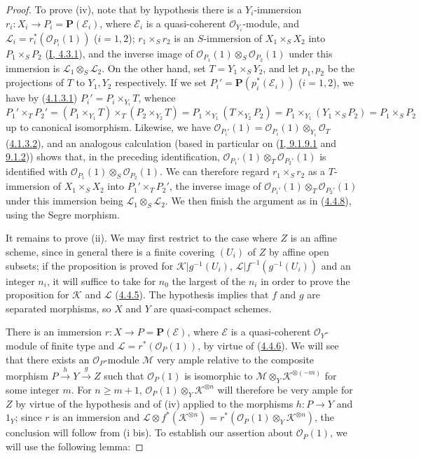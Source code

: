 \begin{proof}
To prove (iv), note that by hypothesis there is a $Y_i$-immersion
$r_i:X_i\to P_i=\mathbf{P}(\mathcal{E}_i)$, where $\mathcal{E}_i$ is a
quasi-coherent $\mathcal{O}_{Y_i}$-module, and
$\mathcal{L}_i=r_i^*(\mathcal{O}_{P_i}(1))$ ($i=1,2$);
$r_1\times_Sr_2$ is an $S$-immersion of $X_1\times_SX_2$ into
$P_1\times_SP_2$ (\hyperref[I.4.3.1]{I, 4.3.1}), and the inverse image of
$\mathcal{O}_{P_1}(1)\otimes_S\mathcal{O}_{P_2}(1)$ under this immersion is
$\mathcal{L}_1\otimes_S\mathcal{L}_2$. On the other hand, set
$T=Y_1\times_SY_2$, and let $p_1,p_2$ be the projections of $T$ to $Y_1,Y_2$
respectively. If we set
$P_i'=\mathbf{P}(p_i^*(\mathcal{E}_i))$ ($i=1,2$), we have by
(\hyperref[II.4.1.3.1]{4.1.3.1}) $P_i'=P_i\times_{Y_i}T$, whence
\[
  P_1'\times_TP_2'
  =(P_1\times_{Y_1}T)\times_T(P_2\times_{Y_2}T)
  =P_1\times_{Y_1}(T\times_{Y_2}P_2)
  =P_1\times_{Y_1}(Y_1\times_SP_2)
  =P_1\times_SP_2
\]
up to canonical isomorphism. Likewise, we have
$\mathcal{O}_{P_i'}(1)=\mathcal{O}_{P_i}(1)\otimes_{Y_i}\mathcal{O}_T$
(\hyperref[II.4.1.3.2]{4.1.3.2}), and an analogous calculation (based in
particular on (\hyperref[I.9.1.9.1]{I, 9.1.9.1} and
\hyperref[I.9.1.2]{9.1.2})) shows that, in the preceding identification,
$\mathcal{O}_{P_1'}(1)\otimes_T\mathcal{O}_{P_2'}(1)$ is identified with
$\mathcal{O}_{P_1}(1)\otimes_S\mathcal{O}_{P_2}(1)$. We can therefore regard
$r_1\times_Sr_2$ as a $T$-immersion of $X_1\times_SX_2$ into
$P_1'\times_TP_2'$, the inverse image of
$\mathcal{O}_{P_1'}(1)\otimes_T\mathcal{O}_{P_2'}(1)$ under this immersion
being $\mathcal{L}_1\otimes_S\mathcal{L}_2$. We then finish the argument
as in (\hyperref[II.4.4.8]{4.4.8}), using the Segre morphism.

It remains to prove (ii). We may first restrict to the case where $Z$ is an
affine scheme, since in general there is a finite covering $(U_i)$ of $Z$ by
affine open subsets; if the proposition is proved for
$\mathcal{K}|g^{-1}(U_i)$, $\mathcal{L}|f^{-1}(g^{-1}(U_i))$ and an integer
$n_i$, it will suffice to take for $n_0$ the largest of the $n_i$ in order to
prove the proposition for $\mathcal{K}$ and $\mathcal{L}$
(\hyperref[II.4.4.5]{4.4.5}). The hypothesis implies that $f$ and $g$ are
separated morphisms, so $X$ and $Y$ are quasi-compact schemes.

There is an immersion $r:X\to P=\mathbf{P}(\mathcal{E})$, where $\mathcal{E}$ is
a quasi-coherent $\mathcal{O}_Y$-module of finite type and
$\mathcal{L}=r^*(\mathcal{O}_P(1))$, by virtue of
(\hyperref[II.4.4.6]{4.4.6}). We will see that there exists an
$\mathcal{O}_P$-module $\mathcal{M}$ very ample relative to the composite
morphism $P\xrightarrow{h}Y\xrightarrow{g}Z$ such that $\mathcal{O}_P(1)$ is
isomorphic to $\mathcal{M}\otimes_Y\mathcal{K}^{\otimes(-m)}$ for some integer
$m$. For $n\geq m+1$,
$\mathcal{O}_P(1)\otimes_Y\mathcal{K}^{\otimes n}$ will therefore be very ample
for $Z$ by virtue of the hypothesis and of (iv) applied to the morphisms
$h:P\to Y$ and $1_Y$; since $r$ is an immersion and
$\mathcal{L}\otimes f^*(\mathcal{K}^{\otimes n})
=r^*(\mathcal{O}_P(1)\otimes_Y\mathcal{K}^{\otimes n})$, the conclusion
will follow from (i bis). To establish our assertion about $\mathcal{O}_P(1)$,
we will use the following lemma:


\end{proof}
